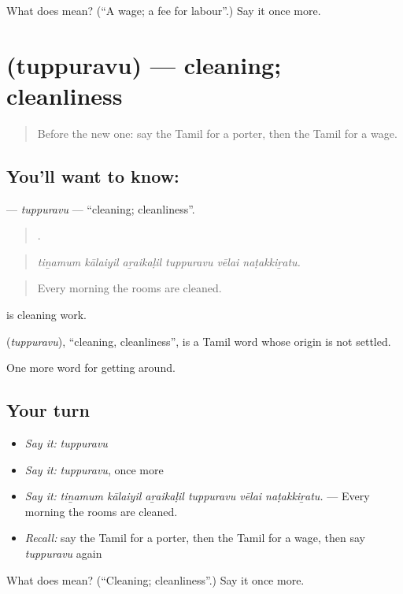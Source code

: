 \begin{tcolorbox}[breakable,colback=teal!4,colframe=teal!35!black,title={Before you move on}]
What does  mean? (\textquotedblleft{}A wage; a fee for labour\textquotedblright{}.) Say it once more.
\end{tcolorbox}
\section[\texorpdfstring{\ta{துப்புரவு} (tuppuravu)}{துப்புரவு (tuppuravu)}]{ (tuppuravu) — cleaning; cleanliness}

\label{lesson:TA-C420-tuppuravu}



\begin{quote}
Before the new one: say the Tamil for a porter, then the Tamil for a wage.
\end{quote}

\subsection*{You'll want to know: }
\textbf{} — \emph{tuppuravu} — \textquotedblleft{}cleaning; cleanliness\textquotedblright{}.

\begin{quote}
     .
\end{quote}

\begin{quote}
\emph{tiṉamum kālaiyil aṟaikaḷil tuppuravu vēlai naṭakkiṟatu.}
\end{quote}

\begin{quote}
Every morning the rooms are cleaned.
\end{quote}

  is cleaning work.

\begin{cousinweb}
\textbf{} (\emph{tuppuravu}), \textquotedblleft{}cleaning, cleanliness\textquotedblright{}, is a Tamil word whose origin is not settled.
\end{cousinweb}

\begin{grammarlens}[title={What you've built}]
One more word for getting around.
\end{grammarlens}

\subsection*{Your turn}
\begin{itemize}
\raggedright
  \item \emph{Say it:} \emph{tuppuravu}
  \item \emph{Say it:} \emph{tuppuravu}, once more
  \item \emph{Say it:} \emph{tiṉamum kālaiyil aṟaikaḷil tuppuravu vēlai naṭakkiṟatu.} — Every morning the rooms are cleaned.
  \item \emph{Recall:} say the Tamil for a porter, then the Tamil for a wage, then say \emph{tuppuravu} again
\end{itemize}

\begin{tcolorbox}[breakable,colback=teal!4,colframe=teal!35!black,title={Before you move on}]
What does  mean? (\textquotedblleft{}Cleaning; cleanliness\textquotedblright{}.) Say it once more.
\end{tcolorbox}
